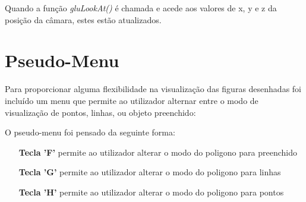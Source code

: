 Quando a função \textit{gluLookAt()} é chamada e acede aos valores de x, y e z da posição da câmara, estes estão atualizados.

\section{Pseudo-Menu}

Para proporcionar alguma flexibilidade na visualização das figuras desenhadas foi incluído um menu que permite ao utilizador alternar entre o modo de visualização de pontos, linhas, ou objeto preenchido:


O pseudo-menu foi pensado da seguinte forma:

\begin{itemize}
	\item[\textbf{Tecla 'F'}] permite ao utilizador alterar o modo do poligono para preenchido
	\item[\textbf{Tecla 'G'}] permite ao utilizador alterar o modo do poligono para linhas
	\item[\textbf{Tecla 'H'}] permite ao utilizador alterar o modo do poligono para pontos
\end{itemize}









